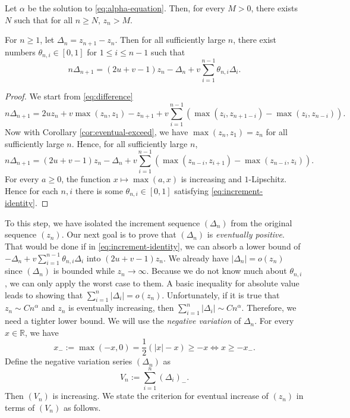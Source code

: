 \begin{corollary}
  \label{cor:eventual-exceed}
  Let $\alpha$ be the solution to \eqref{eq:alpha-equation}. Then, for every $M > 0$, there exists $N$ such that for all $n \ge N$, $z_n > M$.
\end{corollary}

\begin{lemma}
  \label{lem:increment-identity}
  For $n\ge 1$, let $\Delta_n=z_{n+1}-z_n$. Then for all sufficiently large $n$, there exist numbers $\theta_{n,i}\in [0,1]$ for $1\le i\le n-1$ such that
  \begin{equation}
    \label{eq:increment-identity}
    n\Delta_{n+1} = (2u+v-1)z_n-\Delta_n +v\sum_{i=1}^{n-1}\theta_{n,i}\Delta_i.
  \end{equation}
\end{lemma}

\begin{proof}
  We start from \eqref{eq:difference}
  $$n\Delta_{n+1} = 2uz_n + v\max(z_n,z_1) - z_{n+1} + v\sum_{i=1}^{n-1} (\max(z_i, z_{n+1-i}) - \max(z_i, z_{n-i})).$$
  Now with Corollary \ref{cor:eventual-exceed}, we have $\max(z_n,z_1)=z_n$ for all sufficiently large $n$. Hence, for all sufficiently large $n$,
  $$n\Delta_{n+1} = (2u+v-1)z_n -\Delta_n + v\sum_{i=1}^{n-1} (\max(z_{n-i}, z_{i+1}) - \max(z_{n-i}, z_{i})).$$
  For every $a \ge 0$, the function $x\mapsto \max(a,x)$ is increasing and $1$-Lipschitz. Hence for each $n,i$ there is some $\theta_{n,i}\in[0,1]$ satisfying \eqref{eq:increment-identity}.
\end{proof}

To this step, we have isolated the increment sequence $(\Delta_n)$ from the original sequence $(z_n)$. Our next goal is to prove that $(\Delta_n)$ is \textit{eventually positive}. That would be done if in \eqref{eq:increment-identity}, we can absorb a lower bound of $-\Delta_n + v\sum_{i=1}^{n-1}\theta_{n,i}\Delta_i$ into $(2u+v-1)z_n$. We already have $|\Delta_n| = o(z_n)$ since $(\Delta_n)$ is bounded while $z_n\to\infty$. Because we do not know much about $\theta_{n,i}$, we can only apply the worst case to them. A basic inequality for absolute value leads to showing that $\sum_{i=1}^{n}|\Delta_i| = o(z_n)$. Unfortunately, if it is true that $z_n\sim Cn^\alpha$ and $z_n$ is eventually increasing, then $\sum_{i=1}^{n}|\Delta_i| \sim Cn^\alpha$. Therefore, we need a tighter lower bound. We will use the \textit{negative variation} of $\Delta_n$. For every $x\in\mathbb{R}$, we have
\begin{equation}
  x_{-} := \max(-x,0) = \dfrac{1}{2}(|x| - x) \ge -x \iff x \ge -x_{-}.
\end{equation}
Define the negative variation series $(\Delta_n)$ as
\begin{equation}
  \label{eq:negative-variation}
  V_n := \sum_{i=1}^{n} (\Delta_i)_{-}.
\end{equation}
Then $(V_n)$ is increasing. We state the criterion for eventual increase of $(z_n)$ in terms of $(V_n)$ as follows.

